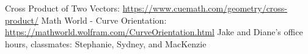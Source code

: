 \documentclass [12pt]{article}
\begin{document}

\begin{thebibliography}{1}
Cross Product of Two Vectors: \url{https://www.cuemath.com/geometry/cross-product/}
Math World - Curve Orientation: \url{https://mathworld.wolfram.com/CurveOrientation.html}
Jake and Diane's office hours, classmates: Stephanie, Sydney, and MacKenzie
\end{thebibliography}
\end{document}
